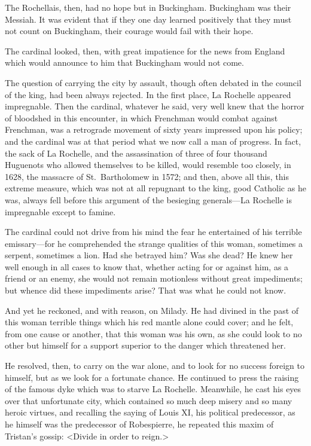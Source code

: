 The Rochellais, then, had no hope but in Buckingham. Buckingham was their Messiah. It was evident that if they one day learned positively that they must not count on Buckingham, their courage would fail with their hope. 

The cardinal looked, then, with great impatience for the news from England which would announce to him that Buckingham would not come. 

The question of carrying the city by assault, though often debated in the council of the king, had been always rejected. In the first place, La Rochelle appeared impregnable. Then the cardinal, whatever he said, very well knew that the horror of bloodshed in this encounter, in which Frenchman would combat against Frenchman, was a retrograde movement of sixty years impressed upon his policy; and the cardinal was at that period what we now call a man of progress. In fact, the sack of La Rochelle, and the assassination of three of four thousand Huguenots who allowed themselves to be killed, would resemble too closely, in 1628, the massacre of St.~Bartholomew in 1572; and then, above all this, this extreme measure, which was not at all repugnant to the king, good Catholic as he was, always fell before this argument of the besieging generals—La Rochelle is impregnable except to famine. 

The cardinal could not drive from his mind the fear he entertained of his terrible emissary—for he comprehended the strange qualities of this woman, sometimes a serpent, sometimes a lion. Had she betrayed him? Was she dead? He knew her well enough in all cases to know that, whether acting for or against him, as a friend or an enemy, she would not remain motionless without great impediments; but whence did these impediments arise? That was what he could not know. 

And yet he reckoned, and with reason, on Milady. He had divined in the past of this woman terrible things which his red mantle alone could cover; and he felt, from one cause or another, that this woman was his own, as she could look to no other but himself for a support superior to the danger which threatened her. 

He resolved, then, to carry on the war alone, and to look for no success foreign to himself, but as we look for a fortunate chance. He continued to press the raising of the famous dyke which was to starve La Rochelle. Meanwhile, he cast his eyes over that unfortunate city, which contained so much deep misery and so many heroic virtues, and recalling the saying of Louis XI, his political predecessor, as he himself was the predecessor of Robespierre, he repeated this maxim of Tristan's gossip: <Divide in order to reign.> 


